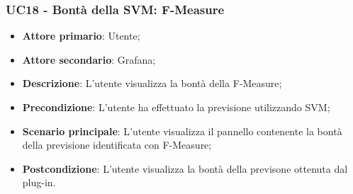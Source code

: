 \subsubsection{UC18 - Bontà della SVM: F-Measure}
\label{sssec:uc18}
\begin{itemize}
  \item \textbf{Attore primario}: Utente;
  \item \textbf{Attore secondario}: Grafana;
  \item \textbf{Descrizione}: L'utente visualizza la bontà della F-Measure;
  \item \textbf{Precondizione}: L'utente ha effettuato la previsione utilizzando SVM;
  \item \textbf{Scenario principale}: L'utente visualizza il pannello contenente la bontà della previsione identificata con F-Measure;
  \item \textbf{Postcondizione}: L'utente visualizza la bontà della previsone ottenuta dal plug-in.
\end{itemize}
